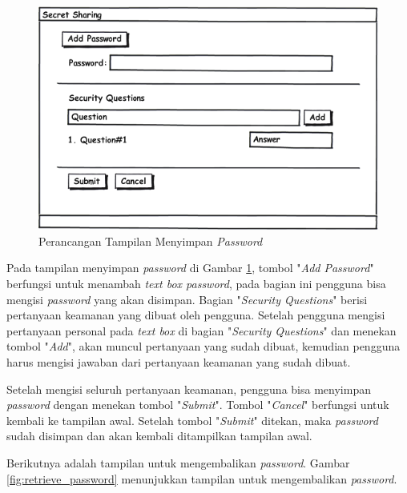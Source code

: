 \begin{figure}[H]
	\centerline{\includegraphics[scale=0.5]{Gambar/store_password}}
	\caption{Perancangan Tampilan Menyimpan \textit{Password}}\label{fig:store_password}
\end{figure}

Pada tampilan menyimpan \textit{password} di Gambar \ref{fig:store_password}, tombol "\textit{Add Password}" berfungsi untuk menambah \textit{text box password}, pada bagian ini pengguna bisa mengisi \textit{password} yang akan disimpan. Bagian "\textit{Security Questions}" berisi pertanyaan keamanan yang dibuat oleh pengguna. Setelah pengguna mengisi pertanyaan personal pada \textit{text box} di bagian "\textit{Security Questions}" dan menekan tombol "\textit{Add}", akan muncul pertanyaan yang sudah dibuat, kemudian pengguna harus mengisi jawaban dari pertanyaan keamanan yang sudah dibuat.

Setelah mengisi seluruh pertanyaan keamanan, pengguna bisa menyimpan \textit{password} dengan menekan tombol "\textit{Submit}". Tombol "\textit{Cancel}" berfungsi untuk kembali ke tampilan awal. Setelah tombol "\textit{Submit}" ditekan, maka \textit{password} sudah disimpan dan akan kembali ditampilkan tampilan awal.

Berikutnya adalah tampilan untuk mengembalikan \textit{password}. Gambar \ref{fig:retrieve_password} menunjukkan tampilan untuk mengembalikan \textit{password}.

